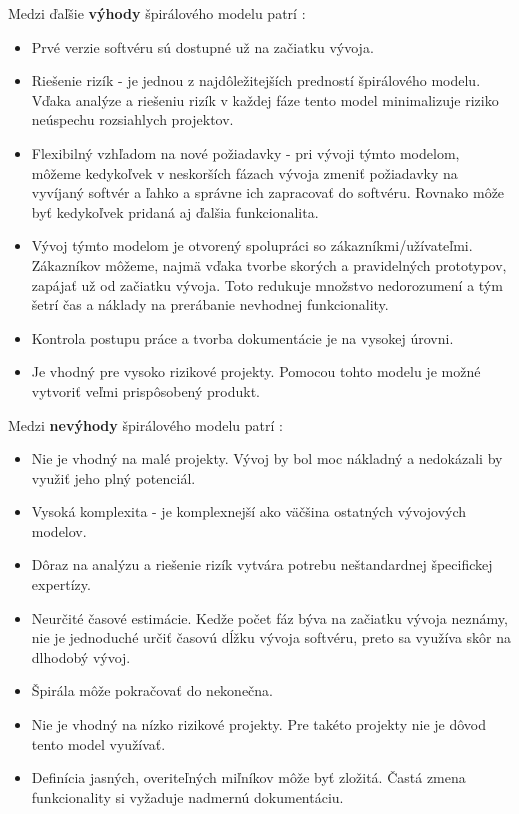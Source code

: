 \documentclass[10pt,twoside,slovak,a4paper]{article}
\begin{document}
Medzi ďaľšie \textbf{výhody} špirálového modelu patrí \cite{SpiralModelProsCons} :
\begin{itemize}
\item Prvé verzie softvéru sú dostupné už na začiatku vývoja.
\item Riešenie rizík - je jednou z najdôležitejších predností špirálového modelu. Vďaka analýze a riešeniu rizík v každej fáze tento model minimalizuje riziko neúspechu rozsiahlych projektov.
\item Flexibilný vzhľadom na nové požiadavky - pri vývoji týmto modelom, môžeme kedykoľvek v neskorších fázach vývoja zmeniť požiadavky na vyvíjaný softvér a ľahko a správne ich zapracovať do softvéru. Rovnako môže byť kedykoľvek pridaná aj ďalšia funkcionalita.
\item Vývoj týmto modelom je otvorený spolupráci so zákazníkmi/užívateľmi. Zákazníkov môžeme, najmä vďaka tvorbe skorých a pravidelných prototypov, zapájať už od začiatku vývoja. Toto redukuje množstvo nedorozumení a tým šetrí čas a náklady na prerábanie nevhodnej funkcionality.
\item Kontrola postupu práce a tvorba dokumentácie je na vysokej úrovni.
\item Je vhodný pre vysoko rizikové projekty. Pomocou tohto modelu je možné vytvoriť veľmi prispôsobený produkt.
\end{itemize}

\bigskip

Medzi  \textbf{nevýhody} špirálového modelu patrí \cite{SpiralModelProsCons} :
\begin{itemize}
\item Nie je vhodný na malé projekty. Vývoj by bol moc nákladný a nedokázali by využiť jeho plný potenciál.
\item Vysoká komplexita - je komplexnejší ako väčšina ostatných vývojových modelov.
\item Dôraz na analýzu a riešenie rizík vytvára potrebu neštandardnej špecifickej expertízy.
\item Neurčité časové estimácie. Kedže počet fáz býva na začiatku vývoja neznámy, nie je jednoduché určiť časovú dĺžku vývoja softvéru, preto sa využíva skôr na dlhodobý vývoj.
\item Špirála môže pokračovať do nekonečna.
\item Nie je vhodný na nízko rizikové projekty. Pre takéto projekty nie je dôvod tento model využívať.
\item Definícia jasných, overiteľných miľníkov môže byť zložitá. Častá zmena funkcionality si vyžaduje nadmernú dokumentáciu.
\end{itemize}
\end{document}
